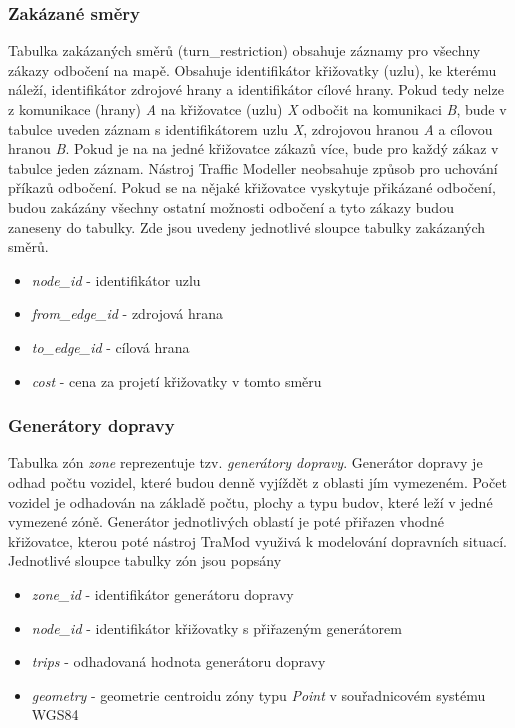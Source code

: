 \subsubsection{Zakázané směry}

Tabulka zakázaných směrů (turn\_restriction) obsahuje záznamy pro všechny zákazy odbočení na mapě. Obsahuje identifikátor křižovatky (uzlu), ke kterému náleží, identifikátor zdrojové hrany a identifikátor cílové hrany. Pokud tedy nelze z komunikace (hrany) \textit{A} na křižovatce (uzlu) \textit{X} odbočit na komunikaci \textit{B}, bude v tabulce uveden záznam s identifikátorem uzlu \textit{X}, zdrojovou hranou \textit{A} a cílovou hranou \textit{B}. Pokud je na na jedné křižovatce zákazů více, bude pro každý zákaz v tabulce jeden záznam. Nástroj Traffic Modeller neobsahuje způsob pro uchování příkazů odbočení. Pokud se na nějaké křižovatce vyskytuje přikázané odbočení, budou zakázány všechny ostatní možnosti odbočení a tyto zákazy budou zaneseny do tabulky. Zde jsou uvedeny jednotlivé sloupce tabulky zakázaných směrů. 

\begin{itemize}
  \item \textit{node\_id} - identifikátor uzlu 
  \item \textit{from\_edge\_id} - zdrojová hrana
  \item \textit{to\_edge\_id} - cílová hrana
  \item \textit{cost} - cena za projetí křižovatky v tomto směru
\end{itemize}
\vspace{10pt}

\subsubsection{Generátory dopravy}

Tabulka zón \textit{zone} reprezentuje tzv. \textit{generátory dopravy}. Generátor dopravy je odhad počtu vozidel, které budou denně vyjíždět z oblasti jím vymezeném. Počet vozidel je odhadován na základě počtu, plochy a typu budov, které leží v jedné vymezené zóně. Generátor jednotlivých oblastí je poté přiřazen vhodné křižovatce, kterou poté nástroj TraMod využivá k modelování dopravních situací. Jednotlivé sloupce tabulky zón jsou popsány 

\begin{itemize}
  \item \textit{zone\_id} - identifikátor generátoru dopravy
  \item \textit{node\_id} - identifikátor křižovatky s přiřazeným generátorem
  \item \textit{trips} - odhadovaná hodnota generátoru dopravy
  \item \textit{geometry} - geometrie centroidu zóny typu \textit{Point} v souřadnicovém systému WGS84
\end{itemize}
\vspace{10pt}

